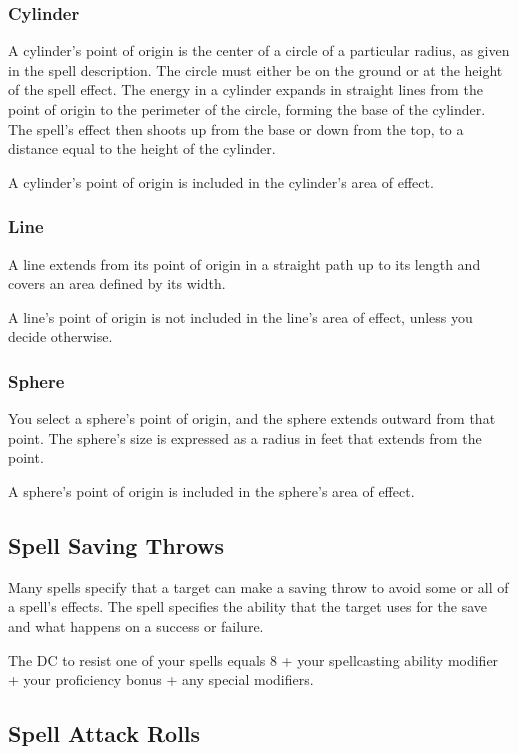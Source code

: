 \subsubsection{Cylinder}

A cylinder's point of origin is the center of a circle of a particular radius, as given in the spell description. The circle must either be on the ground or at the height of the spell effect. The energy in a cylinder expands in straight lines from the point of origin to the perimeter of the circle, forming the base of the cylinder. The spell's effect then shoots up from the base or down from the top, to a distance equal to the height of the cylinder.

A cylinder's point of origin is included in the cylinder's area of effect.

\subsubsection{Line}

A line extends from its point of origin in a straight path up to its length and covers an area defined by its width.

A line's point of origin is not included in the line's area of effect, unless you decide otherwise.

\subsubsection{Sphere}

You select a sphere's point of origin, and the sphere extends outward from that point. The sphere's size is expressed as a radius in feet that extends from the point.

A sphere's point of origin is included in the sphere's area of effect.

\subsection{Spell Saving Throws}

Many spells specify that a target can make a saving throw to avoid some or all of a spell's effects. The spell specifies the ability that the target uses for the save and what happens on a success or failure.

The DC to resist one of your spells equals 8 + your spellcasting ability modifier + your proficiency bonus + any special modifiers.

\subsection{Spell Attack Rolls}

